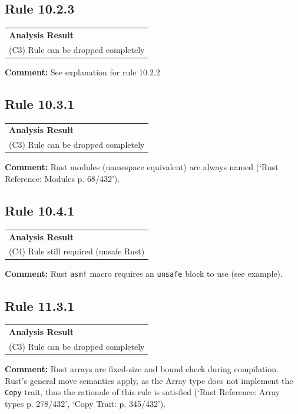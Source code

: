 \subsection*{Rule 10.2.3}
\begin{longtable}{p{13cm}}
\textbf{Analysis Result} \\
(C3) Rule can be dropped completely \\
\end{longtable}
\textbf{Comment:} See explanation for rule 10.2.2 \\
\subsection*{Rule 10.3.1}
\begin{longtable}{p{13cm}}
\textbf{Analysis Result} \\
(C3) Rule can be dropped completely \\
\end{longtable}
\textbf{Comment:} Rust modules (namespace equivalent) are always named (`Rust Reference: Modules p. 68/432'). \\
\subsection*{Rule 10.4.1}
\begin{longtable}{p{13cm}}
\textbf{Analysis Result} \\
(C4) Rule still required (unsafe Rust) \\
\end{longtable}
\textbf{Comment:} Rust \texttt{asm!} macro requires an \texttt{unsafe} block to use (see example). \\


\subsection*{Rule 11.3.1}
\begin{longtable}{p{13cm}}
\textbf{Analysis Result} \\
(C3) Rule can be dropped completely \\
\end{longtable}
\textbf{Comment:} Rust arrays are fixed-size and bound check during compilation. Rust's general move semantics apply, as the Array type does not implement the \texttt{Copy} trait, thus the rationale of this rule is satisfied (`Rust Reference: Array types p. 278/432', `Copy Trait: p. 345/432'). \\
